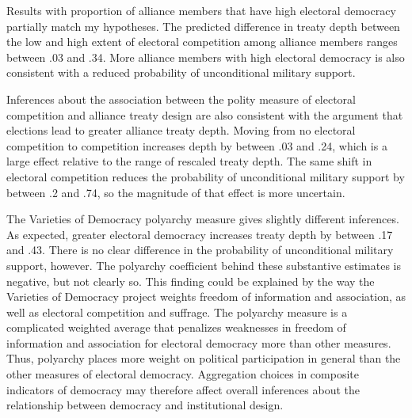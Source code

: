 \documentclass[12pt]{article}
\begin{document}
Results with proportion of alliance members that have high electoral democracy partially match my hypotheses.  
The predicted difference in treaty depth between the low and high extent of electoral competition among alliance members ranges between .03 and .34.
More alliance members with high electoral democracy is also consistent with a reduced probability of unconditional military support. 


Inferences about the association between the polity measure of electoral competition and alliance treaty design are also consistent with the argument that elections lead to greater alliance treaty depth.
Moving from no electoral competition to competition increases depth by between .03 and .24, which is a large effect relative to the range of rescaled treaty depth. 
The same shift in electoral competition reduces the probability of unconditional military support by between .2 and .74, so the magnitude of that effect is more uncertain.  


The Varieties of Democracy polyarchy measure gives slightly different inferences. 
As expected, greater electoral democracy increases treaty depth by between .17 and .43. 
There is no clear difference in the probability of unconditional military support, however.
The polyarchy coefficient behind these substantive estimates is negative, but not clearly so.  
This finding could be explained by the way the Varieties of Democracy project weights freedom of information and association, as well as electoral competition and suffrage. 
The polyarchy measure is a complicated weighted average that penalizes weaknesses in freedom of information and association for electoral democracy more than other measures.
Thus, polyarchy places more weight on political participation in general than the other measures of electoral democracy. 
Aggregation choices in composite indicators of democracy may therefore affect overall inferences about the relationship between democracy and institutional design. 

\end{document}
